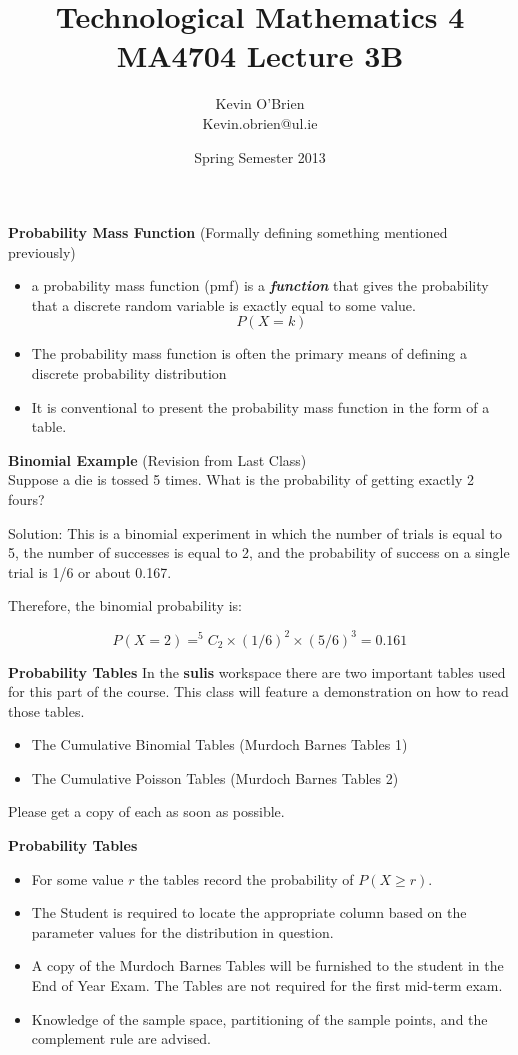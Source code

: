 \documentclass[a4]{beamer}
\title[MA4704]{Technological Mathematics 4 \\ {\normalsize MA4704 Lecture 3B}}
\author[Kevin O'Brien]{Kevin O'Brien \\ {\scriptsize Kevin.obrien@ul.ie}}
\date{Spring Semester 2013}
\institute[Maths \& Stats]{Dept. of Mathematics \& Statistics, \\ University \textit{of} Limerick}
\begin{document}
\titlepage


{
\textbf{Probability Mass Function}
(Formally defining something mentioned previously)
\begin{itemize} \item a probability mass function (pmf) is a \textbf{\emph{function}}
that gives the probability that a discrete random variable is exactly equal to some
value.
\[P(X=k)\]
\item The probability mass function is often the primary means of defining a discrete
probability distribution
\item It is conventional to present the probability mass function in the form of a table.
\end{itemize}
}
{
\textbf{ Binomial Example }
(Revision from Last Class)\\
Suppose a die is tossed 5 times. What is the probability of getting exactly 2 fours?

Solution: This is a binomial experiment in which the number of trials is equal to 5, the number of successes is equal to 2, and the probability of success on a single trial is 1/6 or about 0.167. 

Therefore, the binomial probability is:

\[P(X=2) = ^5C_2 \times (1/6)^2 \times (5/6)^3 = 0.161\]
}
{
\textbf{Probability Tables}
In the \textbf{sulis} workspace there are two important tables used for this part of the course.
This class will feature a demonstration on how to read those tables.
\begin{itemize}
\item The Cumulative Binomial Tables (Murdoch Barnes Tables 1)
\item The Cumulative Poisson Tables (Murdoch Barnes Tables 2)
\end{itemize}
Please get a copy of each as soon as possible.

}

{
\textbf{Probability Tables}
\begin{itemize}
\item For some value $r$ the tables record the probability of $P(X \geq r)$.
\item The Student is required to locate the appropriate column based on the parameter values for the distribution in question.
\item A copy of the Murdoch Barnes Tables will be furnished to the student in the End of Year Exam. The Tables are not required for the first mid-term exam.
\item Knowledge of the sample space, partitioning of the sample points, and the complement rule are advised.
\end{itemize}
}
\end{document}
